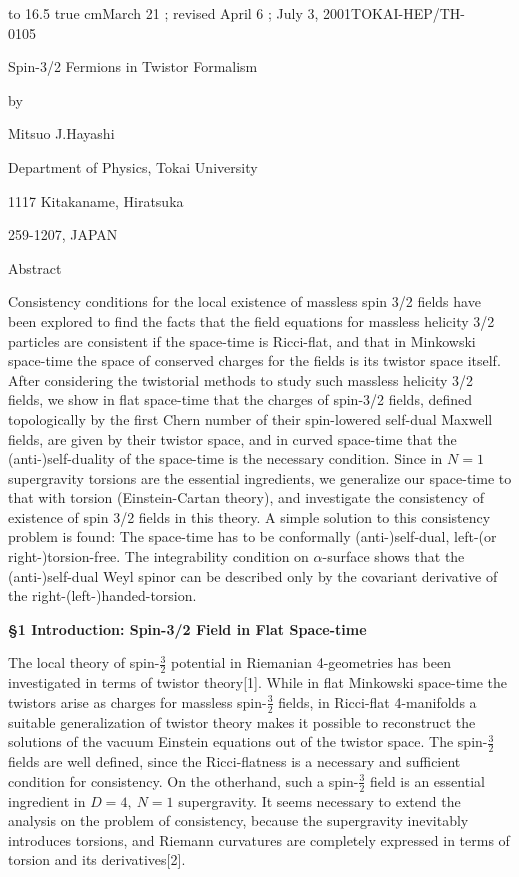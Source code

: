 \documentclass[a4paper,12pt]{article}
\begin{document}
\vskip 12pt
\hbox to 16.5 true cm{March 21 ; revised April 6 ; July 3, 2001\hfill TOKAI-HEP/TH-0105\ \ \ \ \ \ \ }
\vskip 32pt

\centerline{\Huge Spin-3/2 Fermions in Twistor Formalism}

\vskip 16pt
\centerline{\Large by}
\vskip 16pt
\centerline{\Large Mitsuo J.Hayashi}
\vskip 32pt
\centerline{\Large Department of Physics, Tokai University}
\centerline{\Large 1117 Kitakaname, Hiratsuka}
\centerline{\Large 259-1207, JAPAN}
\vskip 48pt

\centerline{\Large Abstract}
\vskip 16pt
 Consistency conditions for the local existence of massless spin 3/2 fields have been explored to find the facts that the field equations for massless helicity 3/2 particles are consistent if the space-time is Ricci-flat, and that in Minkowski space-time the space of conserved charges for the fields is its twistor space itself. After considering the twistorial methods to study such massless helicity 3/2 fields, we show in flat space-time that the charges of spin-3/2 fields, defined topologically by the first Chern number of their spin-lowered self-dual Maxwell fields, are given by their twistor space, and in curved space-time that the (anti-)self-duality of the space-time is the necessary condition. Since in $N=1$ supergravity torsions are the essential ingredients, we generalize our space-time to that with torsion (Einstein-Cartan theory), and investigate the consistency of existence of spin 3/2 fields in this theory. A simple solution to this consistency problem is found: The space-time has to be conformally (anti-)self-dual, left-(or right-)torsion-free.  The integrability condition on $\alpha$-surface shows that the (anti-)self-dual Weyl spinor can be described only by the covariant derivative of the right-(left-)handed-torsion.



\vfill

\eject

\vskip 16pt
{\bf \S 1 Introduction: Spin-3/2 Field in Flat Space-time}
\vskip 16pt

The local theory of spin-$\frac{3}{2}$ potential in Riemanian 4-geometries has been investigated in terms of twistor theory[1].  While in flat Minkowski space-time the twistors arise as charges for massless spin-$\frac{3}{2}$ fields, in Ricci-flat 4-manifolds a suitable generalization of twistor theory makes it possible to reconstruct the solutions of the vacuum Einstein equations out of the twistor space. The spin-$\frac{3}{2}$ fields are well defined, since the Ricci-flatness is a necessary and sufficient condition for consistency.
On the otherhand, such a spin-$\frac{3}{2}$ field is an essential ingredient in $D=4,\ N=1$ supergravity. It seems necessary to extend the analysis on the problem of consistency, because the supergravity inevitably introduces torsions, and Riemann curvatures are completely expressed in terms of torsion and its derivatives[2].
\end{document}
